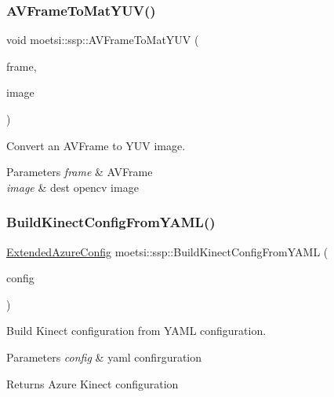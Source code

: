 \subsubsection{\texorpdfstring{A\+V\+Frame\+To\+Mat\+Y\+U\+V()}{AVFrameToMatYUV()}}
{\footnotesize\ttfamily void moetsi\+::ssp\+::\+A\+V\+Frame\+To\+Mat\+Y\+UV (\begin{DoxyParamCaption}\item[{A\+V\+Frame\+SharedP \&}]{frame,  }\item[{cv\+::\+Mat \&}]{image }\end{DoxyParamCaption})}



Convert an A\+V\+Frame to Y\+UV image. 


\begin{DoxyParams}{Parameters}
{\em frame} & A\+V\+Frame \\
\hline
{\em image} & dest opencv image \\
\hline
\end{DoxyParams}
\mbox{\label{namespacemoetsi_1_1ssp_a357441ccde272e5d06fb708b62efa5c1}} 
\subsubsection{\texorpdfstring{Build\+Kinect\+Config\+From\+Y\+A\+M\+L()}{BuildKinectConfigFromYAML()}}
{\footnotesize\ttfamily \hyperlink{structmoetsi_1_1ssp_1_1ExtendedAzureConfig}{Extended\+Azure\+Config} moetsi\+::ssp\+::\+Build\+Kinect\+Config\+From\+Y\+A\+ML (\begin{DoxyParamCaption}\item[{Y\+A\+M\+L\+::\+Node}]{config }\end{DoxyParamCaption})}



Build Kinect configuration from Y\+A\+ML configuration. 


\begin{DoxyParams}{Parameters}
{\em config} & yaml confirguration \\
\hline
\end{DoxyParams}
\begin{DoxyReturn}{Returns}
Azure Kinect configuration 
\end{DoxyReturn}
\mbox{\label{namespacemoetsi_1_1ssp_a3aaefb86d19ad4cca7f0db6c37682195}} 
